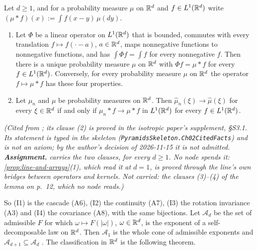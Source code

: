 \begin{theorem}
\label{thm:cited-A30}
\notready
Let $d \ge 1$, and for a probability measure $\mu$ on $\mathbb{R}^d$ and $f \in L^1(\mathbb{R}^d)$ write
$(\mu * f)(x) := \int f(x - y)\,\mu(dy)$.
\begin{enumerate}
\item Let $\Phi$ be a linear operator on $L^1(\mathbb{R}^d)$ that is bounded, commutes with every
translation $f \mapsto f(\cdot - a)$, $a \in \mathbb{R}^d$, maps nonnegative functions to nonnegative
functions, and has $\int\Phi f = \int f$ for every nonnegative $f$. Then there is a unique
probability measure $\mu$ on $\mathbb{R}^d$ with $\Phi f = \mu * f$ for every $f \in L^1(\mathbb{R}^d)$.
Conversely, for every probability measure $\mu$ on $\mathbb{R}^d$ the operator $f \mapsto \mu * f$ has
these four properties.
\item Let $\mu_n$ and $\mu$ be probability measures on $\mathbb{R}^d$. Then
$\widehat\mu_n(\xi) \to \widehat\mu(\xi)$ for every $\xi \in \mathbb{R}^d$ if and only if
$\mu_n * f \to \mu * f$ in $L^1(\mathbb{R}^d)$ for every $f \in L^1(\mathbb{R}^d)$.
\end{enumerate}
\statusA\quad{}\quad\emph{(Cited from ; its
clause (2) is proved in the isotropic paper's supplement, \S S3.1. Its statement is typed in the skeleton
(\texttt{PyramidsSkeleton.Ch02CitedFacts}) and is not an axiom; by the author's decision of
2026-11-15 it is not admitted. \textbf{Assignment.}  carries the two clauses, for
every $d \ge 1$.
No node spends it: \ref{prop:line-and-arrays}(1), which read it at $d = 1$, is proved through
the line's own bridges between operators and kernels. Not
carried: the clauses (3)--(4) of the lemma on p.~12, which no node reads.)}
\end{theorem}

So (I1) is the cascade (A6), (I2) the continuity (A7), (I3) the rotation invariance (A3) and (I4)
the covariance (A8), with the same bijections. Let $\mathcal{A}_d$ be the set of admissible $F$ for
which $\omega \mapsto F(|\omega|)$, $\omega \in \mathbb{R}^d$, is the exponent of a self-decomposable law
on $\mathbb{R}^d$. Then $\mathcal{A}_1$ is the whole cone of admissible exponents and
$\mathcal{A}_{d+1} \subseteq \mathcal{A}_d$ . The classification
in $\mathbb{R}^d$ is the following theorem.

